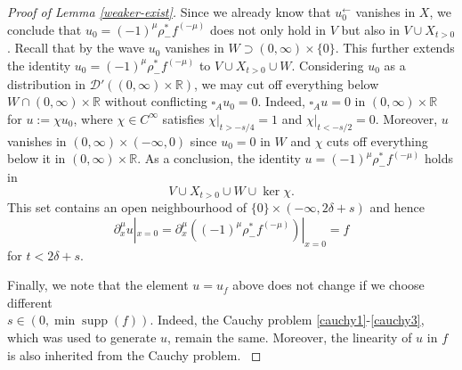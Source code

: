 \documentclass[10pt,a4paper]{article}
\theoremstyle{plain}
\theoremstyle{definition}
\theoremstyle{remark}
\numberwithin{equation}{section}
\newcommand{\R}{\mathbb{R}}
\newcommand{\supp}{\operatorname{supp}}
\begin{document}
\begin{proof}[Proof of Lemma \ref{weaker-exist}]
Since we already know that $u_0^\leftarrow$ vanishes in $X$,  we conclude that $u_0 = (-1)^\mu \rho^*_- f^{(-\mu)} $ does not only hold in $V$ but also in $V \cup X_{t >0}$. 
Recall that by  \cite[Th. 5.1.6.]{duistermaat-FIOs} the wave $u_0$ vanishes in $W \supset (0,\infty) \times \{0\}$. This further extends the identity $u_0 = (-1)^\mu \rho^*_- f^{(-\mu)} $ to 
$V \cup X_{t >0} \cup W$. 
Considering $u_0$ as a distribution in $\mathcal{D}'((0,\infty) \times \R)$, 
we may cut off everything  below $W \cap (0,\infty) \times \R$ without conflicting $\square_A u_0 = 0$. 
Indeed, $\square_A  u  = 0$ in  $(0,\infty) \times \R$ for $u := \chi u_0$, where $\chi \in C^\infty$ satisfies $\chi|_{t>-s/4} = 1$  and $\chi|_{t<-s/2} = 0$. 
Moreover, $u$ vanishes in $(0,\infty) \times (-\infty,0)$ since $u_0 = 0$ in $W$ and $\chi$ cuts off everything below it in $(0,\infty) \times \R$. 
As a conclusion, the identity $u = (-1)^\mu \rho^*_- f^{(-\mu)} $ holds in
\[
V \cup X_{t >0} \cup W \cup \ker \chi .
\]
This set contains an open neighbourhood of $\{0\} \times (-\infty, 2 \delta  + s)$ and hence 
\[
\partial^\mu_x u|_{x=0} = \partial^\mu_x ( (-1)^\mu \rho^*_-  f^{(-\mu)} )|_{x=0} =  f  
\]
for $t<2 \delta + s$. 

{
Finally, we note that the element $u=u_f$ above
does not change if we choose different \\ $s \in (0,\min \supp(f))$. Indeed, the Cauchy problem \eqref{cauchy1}-\eqref{cauchy3}, which was used to generate $u$, remain the same. 
Moreover, the linearity of $u$ in $f$ is also inherited from the Cauchy problem. 
}
\end{proof}

\end{document}
